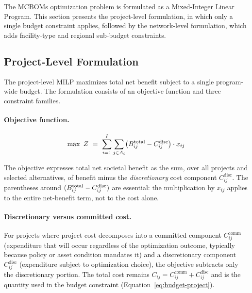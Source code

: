 The MCBOMs optimization problem is formulated as a Mixed-Integer Linear
Program. This section presents the project-level formulation, in which only a
single budget constraint applies, followed by the network-level formulation,
which adds facility-type and regional sub-budget constraints.

\subsection{Project-Level Formulation}
\label{sec:milp-project}

The project-level MILP maximizes total net benefit subject to a single
program-wide budget. The formulation consists of an objective function and
three constraint families.

\paragraph{Objective function.}
\begin{equation}
\max\ Z\ =\ \sum_{i=1}^{I} \sum_{j \in A_i} \bigl( B^{\mathrm{total}}_{ij} - C_{ij}^{\mathrm{disc}} \bigr) \cdot x_{ij}
\label{eq:obj-project}
\end{equation}

The objective expresses total net societal benefit as the sum, over all
projects and selected alternatives, of benefit minus the
\emph{discretionary} cost component $C_{ij}^{\mathrm{disc}}$. The
parentheses around $(B^{\mathrm{total}}_{ij} - C_{ij}^{\mathrm{disc}})$ are essential:
the multiplication by $x_{ij}$ applies to the entire net-benefit term,
not to the cost alone.

\paragraph{Discretionary versus committed cost.} For projects where
project cost decomposes into a committed component $C_{ij}^{\mathrm{comm}}$
(expenditure that will occur regardless of the optimization outcome,
typically because policy or asset condition mandates it) and a
discretionary component $C_{ij}^{\mathrm{disc}}$ (expenditure subject to
optimization choice), the objective subtracts only the discretionary
portion. The total cost remains $C_{ij} = C_{ij}^{\mathrm{comm}} +
C_{ij}^{\mathrm{disc}}$ and is the quantity used in the budget
constraint (Equation~\ref{eq:budget-project}).

